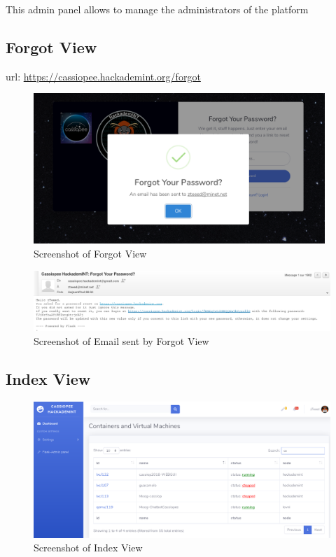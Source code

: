 This admin panel allows to manage the administrators of the platform

\pagebreak

\subsection{Forgot View}
url: \url{https://cassiopee.hackademint.org/forgot}

\begin{figure}[!h]
  \centering
  \includegraphics[width=0.98\textwidth]{images/flask-application-02.png}
  \caption{Screenshot of Forgot View}
  \label{ForgotView}
\end{figure}


\begin{figure}[!h]
  \centering
  \includegraphics[width=1.05\textwidth]{images/flask-application-021.png}
  \caption{Screenshot of Email sent by Forgot View}
  \label{ForgotViewSent}
\end{figure}


\pagebreak

\subsection{Index View}

\begin{figure}[!h]
  \centering
  \includegraphics[width=1.05\textwidth]{images/flask-application-1.png}
  \caption{Screenshot of Index View}
  \label{IndexView}
\end{figure}

